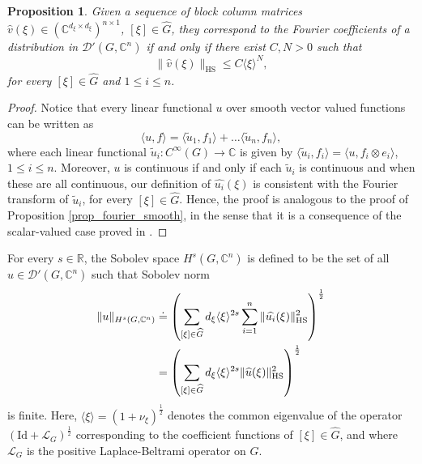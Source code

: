 \documentclass[11pt]{amsart}
\numberwithin{theorem}{section}
\numberwithin{equation}{section}
\newtheorem{prop}[theorem]{Proposition}
\theoremstyle{definition}
\numberwithin{example}{section}
\theoremstyle{definition}
\theoremstyle{definition}
\newcommand{\R}{\mathbb{R}}
\newcommand{\C}{\mathbb{C}}
\newcommand{\HS}{\operatorname{HS}}
\begin{document}
\begin{prop}\label{prop_fourier_distrib}
    Given a sequence of block column matrices $\widehat{v}(\xi)\in(\mathbb{C}^{d_\xi\times d_\xi})^{n\times 1}$, $[\xi]\in\widehat{G}$, they correspond to the Fourier coefficients of a distribution in $\mathcal{D}'(G,\C^n)$ if and only if there exist $C,N>0$ such that 
    \begin{equation*}
        \|\widehat{v}(\xi)\|_{\HS}\leq C\langle \xi\rangle^{N},
    \end{equation*}
     for every $[\xi]\in\widehat{G}$ and $1\leq i\leq n$.
     \end{prop}
\begin{proof}
    Notice that every linear functional $u$ over smooth vector valued functions can be written as
    \begin{equation*}
        \langle u , f\rangle = \langle \tilde u_1,f_1\rangle + \dots \langle \tilde u_n,f_n\rangle,
    \end{equation*}
    where each linear functional $\tilde u_i:C^\infty(G)\to \mathbb{C}$ is given by $\langle \tilde u_i,f_i\rangle =\langle u, f_i\otimes e_i\rangle$, $1\leq i\leq n$. Moreover, $u$ is continuous if and only if each $\tilde u_i$ is continuous and when these are all continuous, our definition of $\widehat{u_i}(\xi)$ is consistent with the Fourier transform of $\tilde u_i$, for every $[\xi]\in\widehat{G}$. Hence, the proof is analogous to the proof of Proposition \ref{prop_fourier_smooth}, in the sense that it is a consequence of the scalar-valued case proved in \cite{Ruz}.
\end{proof}


For every $s\in\R$, the Sobolev space  $H^{s}(G,\C^n)$ is defined to be the set of all $u\in \mathcal{D}'(G,\C^n)$ such that Sobolev norm
\begin{align}\label{eqsobonorm}
    \|u\|_{H^{s}(G,\C^n)}
    &\doteq \left(\sum_{[\xi]\in\widehat{G}}d_\xi\langle \xi\rangle^{2s} \sum_{i=1}^{n}\|\widehat{u_i}(\xi)\|_{\HS}^2\right)^{\frac{1}{2}}\\
&=\left(\sum_{[\xi]\in\widehat{G}}d_\xi\langle \xi\rangle^{2s} \|\widehat{u}(\xi)\|_{\HS}^2\right)^{\frac{1}{2}}\notag
\end{align}
is finite. Here, $\langle\xi\rangle = (1+\nu_\xi)^{\frac{1}{2}}$ denotes the common eigenvalue of the operator $(\text{Id}+\mathcal{L}_G)^{\frac{1}{2}}$ corresponding to the coefficient functions of $[\xi]\in\widehat{G}$, and where $\mathcal{L}_G$ is the positive Laplace-Beltrami operator on $G$. 
\end{document}
